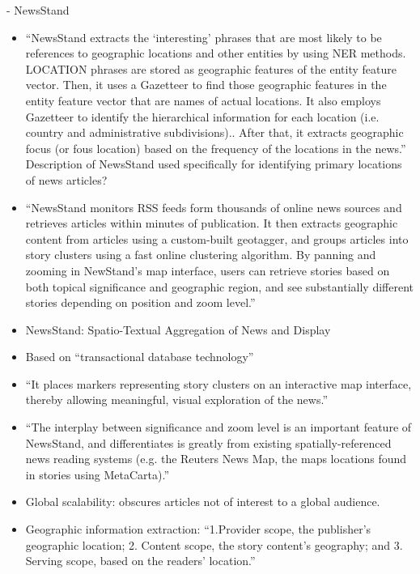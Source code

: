 - NewsStand
\begin{itemize}
	\item {\color{orange} “NewsStand extracts the ‘interesting’ phrases that are most likely to be references to geographic locations and other entities by using NER methods. LOCATION phrases are stored as geographic features of the entity feature vector. Then, it uses a Gazetteer to find those geographic features in the entity feature vector that are names of actual locations. It also employs  Gazetteer to identify the hierarchical information for each location (i.e. country and administrative subdivisions).. After that, it extracts geographic focus (or fous location) based on the frequency of the locations in the news.”  Description of NewsStand used specifically for identifying primary locations of news articles?\cite{Imani2019}}
	\item {\color{orange}“NewsStand monitors RSS feeds form thousands of online news sources and retrieves articles within minutes of publication. It then extracts geographic content from articles using a custom-built geotagger, and groups articles into story clusters using a fast online clustering algorithm. By panning and zooming in NewStand’s map interface, users can retrieve stories based on both topical significance and geographic region, and see substantially different stories depending on position and zoom level.”\cite{Teitler2008}}
	\item {\color{orange}NewsStand: Spatio-Textual Aggregation of News and Display \cite{Teitler2008}}
	\item {\color{orange}Based on ``transactional database technology'' \cite{Teitler2008}}
	\item {\color{orange} “It places markers representing story clusters on an interactive map interface, thereby allowing meaningful, visual exploration of the news.”\cite{Teitler2008}}
	\item {\color{orange} “The interplay between significance and zoom level is an important feature of NewsStand, and differentiates is greatly from existing spatially-referenced news reading systems (e.g. the Reuters News Map, the maps locations found in stories using MetaCarta).”\cite{Teitler2008}}
	\item {\color{orange} Global scalability: obscures articles not of interest to a global audience.\cite{Teitler2008}}
	\item {\color{orange} Geographic information extraction: “1.Provider scope, the publisher’s geographic location; 2. Content scope, the story content’s geography; and 3. Serving scope, based on the readers’ location.”\cite{Tietler2008}}

\end{itemize}
